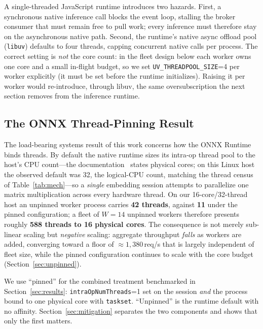 \documentclass[conference]{IEEEtran}
\begin{document}
A single-threaded JavaScript runtime introduces two hazards. First, a synchronous native inference call blocks the event loop, stalling the broker consumer that must remain free to pull work; every inference must therefore stay on the asynchronous native path. Second, the runtime's native async offload pool (\texttt{libuv}) defaults to four threads, capping concurrent native calls per process. The correct setting is \emph{not} the core count: in the fleet design below each worker owns one core and a small in-flight budget, so we set \texttt{UV\_THREADPOOL\_SIZE}=4 per worker explicitly (it must be set before the runtime initializes). Raising it per worker would re-introduce, through libuv, the same oversubscription the next section removes from the inference runtime.

\subsection{The ONNX Thread-Pinning Result}
\label{sec:pinning}

The load-bearing systems result of this work concerns how the ONNX Runtime binds threads. By default the native runtime sizes its intra-op thread pool to the host's CPU count---the documentation~\cite{ort_docs} states physical cores; on this Linux host the observed default was 32, the logical-CPU count, matching the thread census of Table~\ref{tab:mech}---so a \emph{single} embedding session attempts to parallelize one matrix multiplication across every hardware thread. On our 16-core/32-thread host an unpinned worker process carries \textbf{42 threads}, against \textbf{11} under the pinned configuration; a fleet of $W{=}14$ unpinned workers therefore presents roughly \textbf{588 threads to 16 physical cores}. The consequence is not merely sub-linear scaling but \emph{negative} scaling: aggregate throughput \emph{falls} as workers are added, converging toward a floor of ${\approx}1{,}380$\,req/s that is largely independent of fleet size, while the pinned configuration continues to scale with the core budget (Section~\ref{sec:unpinned}).

We use ``pinned'' for the combined treatment benchmarked in Section~\ref{sec:results}: \texttt{intraOpNumThreads}=1 set on the session \emph{and} the process bound to one physical core with \texttt{taskset}. ``Unpinned'' is the runtime default with no affinity. Section~\ref{sec:mitigation} separates the two components and shows that only the first matters.
\end{document}
